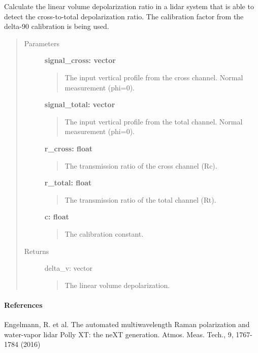 \documentclass[letterpaper,10pt,english]{sphinxmanual}
\begin{document}
\begin{fulllineitems}
\label{depolarization:depolarization.volume_depolarization_cross_total}
Calculate the linear volume depolarization ratio in a lidar system that is
able to detect the cross-to-total depolarization ratio.
The calibration factor from the delta-90 calibration is being used.
\begin{quote}\begin{description}
\item[{Parameters}] \leavevmode
\textbf{signal\_cross: vector}
\begin{quote}

The input vertical profile from the cross channel. Normal measurement (phi=0).
\end{quote}

\textbf{signal\_total: vector}
\begin{quote}

The input vertical profile from the total channel. Normal measurement (phi=0).
\end{quote}

\textbf{r\_cross: float}
\begin{quote}

The transmission ratio of the cross channel (Rc).
\end{quote}

\textbf{r\_total: float}
\begin{quote}

The transmission ratio of the total channel (Rt).
\end{quote}

\textbf{c: float}
\begin{quote}

The calibration constant.
\end{quote}

\item[{Returns}] \leavevmode
delta\_v: vector
\begin{quote}

The linear volume depolarization.
\end{quote}

\end{description}\end{quote}
\paragraph{References}

Engelmann, R. et al. The automated multiwavelength Raman polarization and water-vapor
lidar Polly XT: the neXT generation. Atmos. Meas. Tech., 9, 1767-1784 (2016)

\end{fulllineitems}
\end{document}
